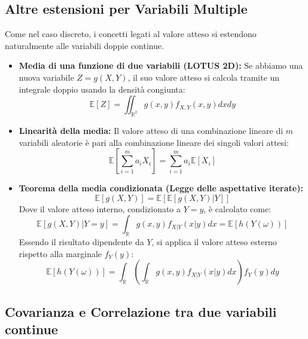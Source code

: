\subsection{Altre estensioni per Variabili Multiple}

Come nel caso discreto, i concetti legati al valore atteso si estendono naturalmente alle variabili doppie continue.

\begin{itemize}
    \item \textbf{Media di una funzione di due variabili (LOTUS 2D):} Se abbiamo una nuova variabile $Z = g(X, Y)$, il suo valore atteso si calcola tramite un integrale doppio usando la densità congiunta:
    \begin{equation}
    \mathbb{E}[Z] = \iint_{\mathbb{R}^2} g(x,y) f_{X,Y}(x,y) dx dy
    \end{equation}

    \item \textbf{Linearità della media:} Il valore atteso di una combinazione lineare di $m$ variabili aleatorie è pari alla combinazione lineare dei singoli valori attesi:
    \begin{equation}
    \mathbb{E}\left[ \sum_{i=1}^{m} a_i X_i \right] = \sum_{i=1}^{m} a_i \mathbb{E}[X_i]
    \end{equation}

    \item \textbf{Teorema della media condizionata (Legge delle aspettative iterate):}
    \begin{equation}
    \mathbb{E}[g(X, Y)] = \mathbb{E}[\mathbb{E}[g(X, Y)|Y]]
    \end{equation}
    Dove il valore atteso interno, condizionato a $Y=y$, è calcolato come:
    \begin{equation}
    \mathbb{E}[g(X, Y)|Y=y] = \int_{\mathbb{R}} g(x,y) f_{X|Y}(x|y) dx = \mathbb{E}[h(Y(\omega))] 
    \end{equation}
    Essendo il risultato dipendente da $Y$, si applica il valore atteso esterno rispetto alla marginale $f_Y(y)$:
    \begin{equation}
    \mathbb{E}[h(Y(\omega))] = \int_{\mathbb{R}} \left( \int_{\mathbb{R}} g(x,y) f_{X|Y}(x|y) dx \right) f_Y(y) dy
    \end{equation}
\end{itemize}

\subsection{Covarianza e Correlazione tra due variabili continue}

